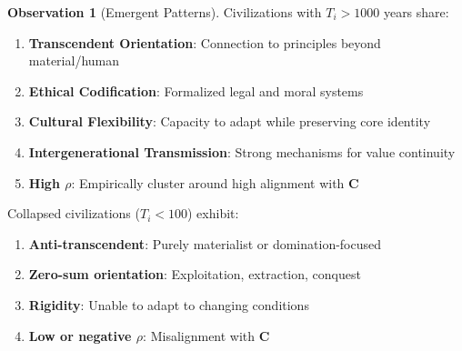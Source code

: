 \documentclass[11pt,a4paper]{article}
\theoremstyle{definition}
\newtheorem{observation}{Observation}[section]
\theoremstyle{remark}
\begin{document}
\begin{observation}[Emergent Patterns]
Civilizations with \(T_i > 1000\) years share:
\begin{enumerate}
\item \textbf{Transcendent Orientation}: Connection to principles beyond material/human
\item \textbf{Ethical Codification}: Formalized legal and moral systems
\item \textbf{Cultural Flexibility}: Capacity to adapt while preserving core identity
\item \textbf{Intergenerational Transmission}: Strong mechanisms for value continuity
\item \textbf{High \(\rho\)}: Empirically cluster around high alignment with \(\mathbf{C}\)
\end{enumerate}

Collapsed civilizations (\(T_i < 100\)) exhibit:
\begin{enumerate}
\item \textbf{Anti-transcendent}: Purely materialist or domination-focused
\item \textbf{Zero-sum orientation}: Exploitation, extraction, conquest
\item \textbf{Rigidity}: Unable to adapt to changing conditions
\item \textbf{Low or negative \(\rho\)}: Misalignment with \(\mathbf{C}\)
\end{enumerate}
\end{observation}
\end{document}
